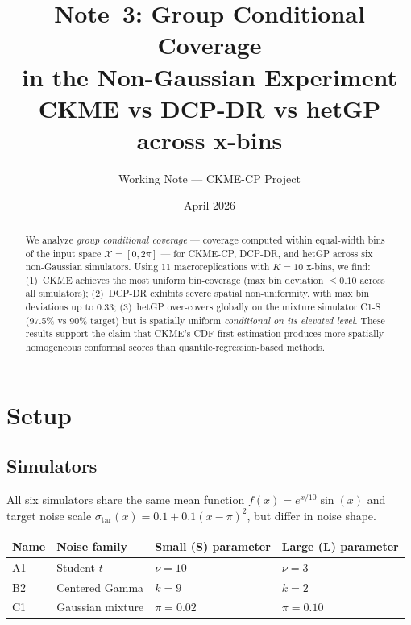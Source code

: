 \documentclass[11pt]{article}
\title{Note~3: Group Conditional Coverage\\
  in the Non-Gaussian Experiment\\[4pt]
  {\large CKME vs DCP-DR vs hetGP across x-bins}}
\author{Working Note --- CKME-CP Project}
\date{April 2026}
\theoremstyle{remark}
\begin{document}
\maketitle

\begin{abstract}
We analyze \emph{group conditional coverage} --- coverage computed
within equal-width bins of the input space $\mathcal{X} = [0, 2\pi]$ ---
for CKME-CP, DCP-DR, and hetGP across six non-Gaussian simulators.
Using 11 macroreplications with $K=10$ x-bins, we find:
(1)~CKME achieves the most uniform bin-coverage (max bin deviation
$\le 0.10$ across all simulators);
(2)~DCP-DR exhibits severe spatial non-uniformity, with max bin
deviations up to 0.33;
(3)~hetGP over-covers globally on the mixture simulator C1-S
(97.5\% vs 90\% target) but is spatially uniform \emph{conditional on
its elevated level}.
These results support the claim that CKME's CDF-first estimation
produces more spatially homogeneous conformal scores than
quantile-regression-based methods.
\end{abstract}

\tableofcontents
\newpage


\section{Setup}
\label{sec:setup}

\subsection{Simulators}

All six simulators share the same mean function
$f(x) = e^{x/10}\sin(x)$ and target noise scale
$\sigma_{\mathrm{tar}}(x) = 0.1 + 0.1(x-\pi)^2$, but differ in
noise shape.

\medskip
\begin{center}
\begin{tabular}{llll}
\toprule
Name & Noise family & Small (S) parameter & Large (L) parameter \\
\midrule
A1 & Student-$t$ & $\nu=10$ & $\nu=3$ \\
B2 & Centered Gamma & $k=9$ & $k=2$ \\
C1 & Gaussian mixture & $\pi=0.02$ & $\pi=0.10$ \\
\bottomrule
\end{tabular}
\end{center}
\end{document}
